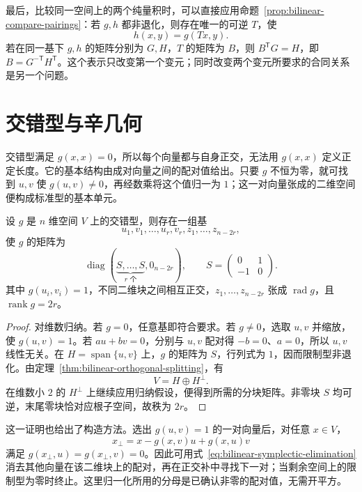 最后，比较同一空间上的两个纯量积时，可以直接应用命题~\ref{prop:bilinear-compare-pairings}：若 $g,h$ 都非退化，则存在唯一的可逆 $T$，使
\[
    h(x,y)=g(Tx,y).
\]
若在同一基下 $g,h$ 的矩阵分别为 $G,H$，$T$ 的矩阵为 $B$，则 $B^{\mathsf T}G=H$，即 $B=G^{-\mathsf T}H^{\mathsf T}$。这个表示只改变第一个变元；同时改变两个变元所要求的合同关系是另一个问题。

\section{交错型与辛几何}
\label{sec:bilinear-symplectic-geometry}

交错型满足 $g(x,x)=0$，所以每个向量都与自身正交，无法用 $g(x,x)$ 定义正定长度。它的基本结构由成对向量之间的配对值给出。只要 $g$ 不恒为零，就可找到 $u,v$ 使 $g(u,v)\neq0$，再经数乘将这个值归一为 $1$；这一对向量张成的二维空间便构成标准型的基本单元。

\begin{theorem}
\label{thm:bilinear-alternating-normal-form}
设 $g$ 是 $n$ 维空间 $V$ 上的交错型，则存在一组基
\[
    u_1,v_1,\ldots,u_r,v_r,z_1,\ldots,z_{n-2r},
\]
使 $g$ 的矩阵为
\begin{equation}
\label{eq:bilinear-alternating-normal-form}
    \operatorname{diag}(\underbrace{S,\ldots,S}_{r\text{ 个}},0_{n-2r}),
    \qquad S=\begin{pmatrix}0&1\\-1&0\end{pmatrix}.
\end{equation}
其中 $g(u_i,v_i)=1$，不同二维块之间相互正交，$z_1,\ldots,z_{n-2r}$ 张成 $\operatorname{rad}g$，且 $\operatorname{rank}g=2r$。
\end{theorem}

\begin{proof}
对维数归纳。若 $g=0$，任意基即符合要求。若 $g\neq0$，选取 $u,v$ 并缩放，使 $g(u,v)=1$。若 $au+bv=0$，分别与 $u,v$ 配对得 $-b=0$、$a=0$，所以 $u,v$ 线性无关。在 $H=\operatorname{span}\{u,v\}$ 上，$g$ 的矩阵为 $S$，行列式为 $1$，因而限制型非退化。由定理~\ref{thm:bilinear-orthogonal-splitting}，有
\[
    V=H\oplus H^\perp.
\]
在维数小 $2$ 的 $H^\perp$ 上继续应用归纳假设，便得到所需的分块矩阵。非零块 $S$ 均可逆，末尾零块恰对应根子空间，故秩为 $2r$。
\end{proof}

这一证明也给出了构造方法。选出 $g(u,v)=1$ 的一对向量后，对任意 $x\in V$，
\begin{equation}
\label{eq:bilinear-symplectic-elimination}
    x_\perp=x-g(x,v)u+g(x,u)v
\end{equation}
满足 $g(x_\perp,u)=g(x_\perp,v)=0$。因此可用式~\eqref{eq:bilinear-symplectic-elimination} 消去其他向量在该二维块上的配对，再在正交补中寻找下一对；当剩余空间上的限制型为零时终止。这里归一化所用的分母是已确认非零的配对值，无需开平方。

